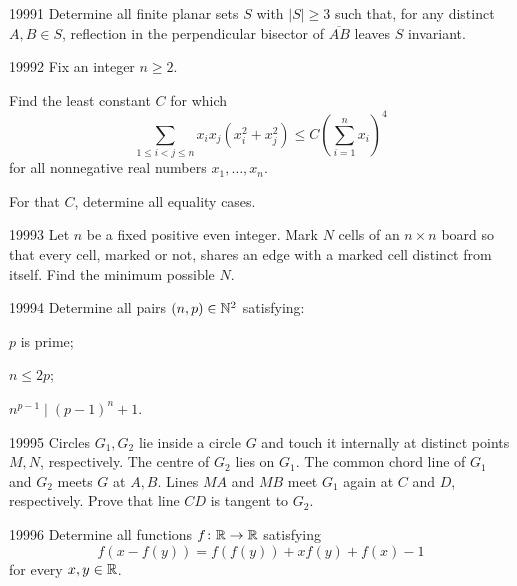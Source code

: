 
\begin{problem}{1999}{1}
Determine all finite planar sets $S$ with $|S|\geq3$ such that, for any distinct $A, B\in S$, reflection in the perpendicular bisector of $\overline{AB}$ leaves $S$ invariant.
\end{problem}

\begin{problem}{1999}{2}
Fix an integer $n\geq2$.
\begin{problemsubparts}
    \item Find the least constant $C$ for which
    \[
        \sum_{1\leq i<j\leq n}x_ix_j(x_i^2+x_j^2)
        \leq C\left(\sum_{i=1}^{n}x_i\right)^4
    \]
    for all nonnegative real numbers $x_1, \dots, x_n$.
    \item For that $C$, determine all equality cases.
\end{problemsubparts}
\end{problem}

\begin{problem}{1999}{3}
Let $n$ be a fixed positive even integer. Mark $N$ cells of an $n\times n$ board so that every cell, marked or not, shares an edge with a marked cell distinct from itself. Find the minimum possible $N$.
\end{problem}

\begin{problem}{1999}{4}
Determine all pairs $(n, p)\in\mathbb{N}^2$ satisfying:
\begin{problemclauses}
    \item $p$ is prime;
    \item $n\leq2p$;
    \item $n^{p-1}\mid (p-1)^n+1$.
\end{problemclauses}
\end{problem}

\begin{problem}{1999}{5}
Circles $G_1, G_2$ lie inside a circle $G$ and touch it internally at distinct points $M, N$, respectively. The centre of $G_2$ lies on $G_1$. The common chord line of $G_1$ and $G_2$ meets $G$ at $A, B$. Lines $MA$ and $MB$ meet $G_1$ again at $C$ and $D$, respectively. Prove that line $CD$ is tangent to $G_2$.
\end{problem}

\begin{problem}{1999}{6}
Determine all functions $f\colon\mathbb{R}\to\mathbb{R}$ satisfying
\[
    f(x-f(y))=f(f(y))+xf(y)+f(x)-1
\]
for every $x, y\in\mathbb{R}$.
\end{problem}
